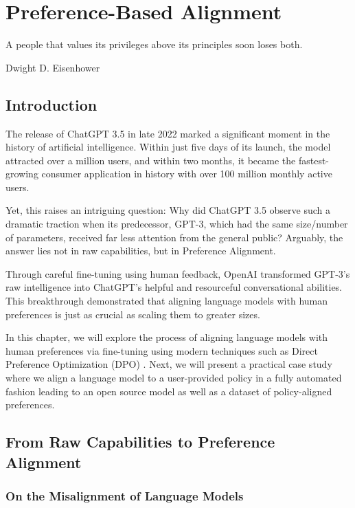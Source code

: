 \setchapterpreamble[u]{\margintoc}
\chapter{Preference-Based Alignment}
\label{chapter:alignment}

\epigraph{A people that values its privileges above its principles soon loses both.}{Dwight D. Eisenhower}

\section{Introduction}

The release of ChatGPT 3.5 in late 2022 marked a significant moment in the history of artificial intelligence. Within just five days of its launch, the model attracted over a million users, and within two months, it became the fastest-growing consumer application in history with over 100 million monthly active users.

Yet, this raises an intriguing question: Why did ChatGPT 3.5 observe such a dramatic traction when its predecessor, GPT-3, which had the same size/number of parameters, received far less attention from the general public? Arguably, the answer lies not in raw capabilities, but in Preference Alignment. 

Through careful fine-tuning using human feedback, OpenAI transformed GPT-3's raw intelligence into ChatGPT's helpful and resourceful conversational abilities. This breakthrough demonstrated that aligning language models with human preferences is just as crucial as scaling them to greater sizes.

In this chapter, we will explore the process of aligning language models with human preferences via fine-tuning using modern techniques such as Direct Preference Optimization (DPO) \cite{rafailov2024directpreferenceoptimizationlanguage}. Next, we will present a practical case study where we align a language model to a user-provided policy in a fully automated fashion leading to an open source model as well as a dataset of policy-aligned preferences.
\section{From Raw Capabilities to Preference Alignment}

\subsection{On the Misalignment of Language Models}

